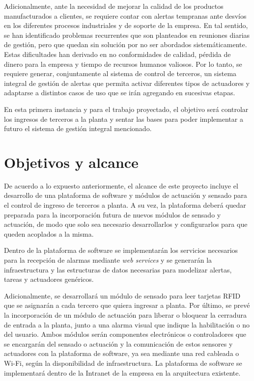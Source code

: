 Adicionalmente, ante la necesidad de mejorar la calidad de los productos manufacturados a clientes, se requiere contar con alertas tempranas ante desvíos en los diferentes procesos industriales y de soporte de la empresa. En tal sentido, se han identificado problemas recurrentes que son planteados en reuniones diarias de gestión, pero que quedan sin solución por no ser abordados sistemáticamente. Estas dificultades han derivado en no conformidades de calidad, pérdida de dinero para la empresa y tiempo de recursos humanos valiosos. Por lo tanto, se requiere generar, conjuntamente al sistema de control de terceros, un sistema integral de gestión de alertas que permita activar diferentes tipos de actuadores y adaptarse a distintos casos de uso que se irán agregando en sucesivas etapas. 

En esta primera instancia y para el trabajo proyectado, el objetivo será controlar los ingresos de terceros a la planta y sentar las bases para poder implementar a futuro el sistema de gestión integral mencionado.


\section{Objetivos y alcance}

De acuerdo a lo expuesto anteriormente, el alcance de este proyecto incluye el desarrollo de una plataforma de software y módulos de actuación y sensado para el control de ingreso de terceros a planta. A su vez, la plataforma deberá quedar preparada para la incorporación futura de nuevos módulos de sensado y actuación, de modo que solo sea necesario desarrollarlos y configurarlos para que queden acoplados a la misma.

Dentro de la plataforma de software se implementarán los servicios necesarios para la recepción de alarmas mediante \textit{web services} y se generarán la infraestructura y las estructuras de datos necesarias para modelizar alertas, tareas y actuadores genéricos. 

Adicionalmente, se desarrollará un módulo de sensado para leer tarjetas RFID que se asignarán a cada tercero que quiera ingresar a planta. Por último, se prevé la incorporación de un módulo de actuación para liberar o bloquear la cerradura de entrada a la planta, junto a una alarma visual que indique la habilitación o no del usuario. Ambos módulos serán componentes electrónicos o controladores que se encargarán del sensado o actuación y la comunicación de estos sensores y actuadores con la plataforma de software, ya sea mediante una red cableada o Wi-Fi, según la disponibilidad de infraestructura. La plataforma de software se implementará dentro de la Intranet de la empresa en la arquitectura existente.

